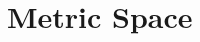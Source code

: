 \documentclass[../main-sheet.tex]{subfiles}
\begin{document}

\chapter{Metric Space}
\end{document}
